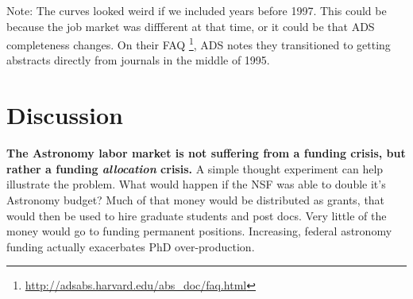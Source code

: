 \documentclass[preprint2]{aastex}
\begin{document}






Note:  The curves looked weird if we included years before 1997. This could be because the job market was diffferent at that time, or it could be that ADS completeness changes. On their FAQ \footnote{\url{http://adsabs.harvard.edu/abs\_doc/faq.html}}, ADS notes they transitioned to getting abstracts directly from journals in the middle of 1995.


\section{Discussion}

{\bf{The Astronomy labor market is not suffering from a funding crisis, but rather a funding {\emph{allocation}} crisis.}} A simple thought experiment can help illustrate the problem. What would happen if the NSF was able to double it's Astronomy budget? Much of that money would be distributed as grants, that would then be used to hire graduate students and post docs. Very little of the money would go to funding permanent positions. Increasing, federal astronomy funding actually exacerbates PhD over-production. 
\end{document}
